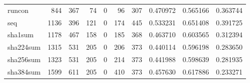 \begin{longtable}{lrrrrrrrrr}
runcon    &                                 844 &                                             367 &                                             74 &                                             0 &                                             96 &                                          307 &                                           0.470972 &                               0.565166 &                             0.363744 \\
seq       &                                1136 &                                             396 &                                            121 &                                             0 &                                            174 &                                          445 &                                           0.533231 &                               0.651408 &                             0.391725 \\
sha1sum   &                                1178 &                                             467 &                                            158 &                                             0 &                                            185 &                                          368 &                                           0.463710 &                               0.603565 &                             0.312394 \\
sha224sum &                                1315 &                                             531 &                                            205 &                                             0 &                                            206 &                                          373 &                                           0.440114 &                               0.596198 &                             0.283650 \\
sha256sum &                                1323 &                                             531 &                                            205 &                                             0 &                                            214 &                                          373 &                                           0.441988 &                               0.598639 &                             0.281935 \\
sha384sum &                                1599 &                                             611 &                                            205 &                                             0 &                                            410 &                                          373 &                                           0.457630 &                               0.617886 &                             0.233271 \\

\end{longtable}
